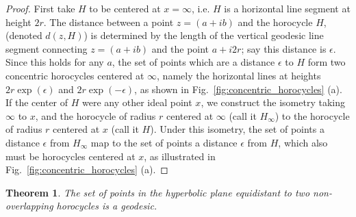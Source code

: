 \documentclass[10pt,a4paper]{article}
\newtheorem{theorem}{Theorem}
\begin{document}
 \begin{proof}
 First take $H$ to be centered at $x = \infty$, i.e. $H$ is a horizontal line segment at height $2r$.  The distance between a point $z = (a+ib)$ and the horocycle $H$, (denoted $d(z, H)$) is determined by the length of the vertical geodesic line segment connecting $z = (a+ib)$ and the point $a + i 2 r$; say this distance is $\epsilon$.  Since this holds for any $a$, the set of points which are a distance $\epsilon$ to $H$ form two concentric horocycles centered at $\infty$, namely the horizontal lines at heights $2r\exp(\epsilon)$ and $2r\exp(-\epsilon)$, as shown in Fig.\ \ref{fig:concentric_horocycles} (a). If the center of $H$ were any other ideal point $x$, we construct the isometry taking $\infty$ to $x$, and the horocycle of radius $r$ centered at $\infty$ (call it $H_{\infty}$) to the horocycle of radius $r$ centered at $x$ (call it  $H$). Under this isometry, the set of points a distance $\epsilon$ from $H_{\infty}$ map to the set of points a distance $\epsilon$ from $H$, which also must be horocycles centered at $x$, as illustrated in Fig.\ \ref{fig:concentric_horocycles} (a).
 \end{proof}

 \begin{theorem}
 The set of points in the hyperbolic plane equidistant to two non-overlapping horocycles is a geodesic.
 \label{thm:voronoibndryisgeo}
 \end{theorem}
\end{document}
